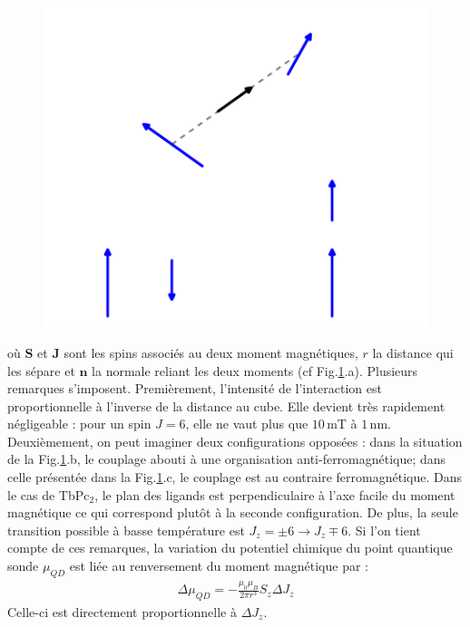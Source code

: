 \begin{figure}
\includegraphics[scale=0.5]{Resultats/Chap1/Figure1/figure1.pdf} 
\caption{}
\label{dipolaire}
\end{figure}

où $\mathbf{S}$ et $\mathbf{J}$ sont les spins associés au deux moment magnétiques, $r$ la distance qui les sépare et $\mathbf{n}$ la normale reliant les deux moments (cf Fig.\ref{dipolaire}.a). Plusieurs remarques s'imposent. Premièrement, l'intensité de l'interaction est proportionnelle à l'inverse de la distance au cube. Elle devient très rapidement négligeable : pour un spin $J=6$, elle ne vaut plus que $10$\,mT à $1$\,nm. Deuxièmement, on peut imaginer deux configurations opposées : dans la situation de la Fig.\ref{dipolaire}.b, le couplage abouti à une organisation anti-ferromagnétique; dans celle présentée dans la Fig.\ref{dipolaire}.c, le couplage est au contraire ferromagnétique. Dans le cas de TbPc$_2$, le plan des ligands est perpendiculaire à l'axe facile du moment magnétique ce qui correspond plutôt à la seconde configuration. De plus, la seule transition possible à basse température est $J_z=\pm6 \rightarrow J_z \mp 6$. Si l'on tient compte de ces remarques, la variation du potentiel chimique du point quantique sonde $\mu_{QD}$ est liée au renversement du moment magnétique par :
\begin{eqnarray}
\Delta \mu_{QD} = -\frac{\mu_0 \mu_B}{2\pi r^3}S_z\Delta J_z\nonumber
\end{eqnarray}
Celle-ci est directement proportionnelle à $\Delta J_z$.

